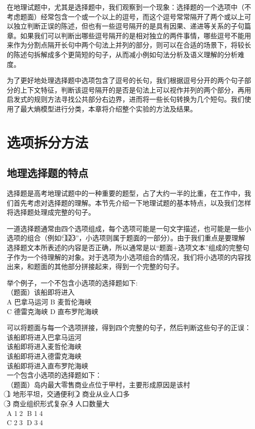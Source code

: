 \documentclass[master, winfont]{njuthesis}
\begin{document}
在地理试题中，尤其是选择题中，我们观察到一个现象：选择题的一个选项中（不考虑题面）经常包含一个或一个以上的逗号，而这个逗号常常隔开了两个或以上可以独立判断正误的陈述，但也有一些逗号隔开的是具有因果、递进等关系的子句篇章。如果我们可以判断出哪些逗号隔开的是相对独立的两件事情，哪些逗号不能用来作为分割点隔开长句中两个句法上并列的部分，则可以在合适的场景下，将较长的陈述句拆解成多个更简短的句子，从而减小例如句法分析及语义理解的分析难度。

为了更好地处理选择题中选项包含了逗号的长句，我们根据逗号分开的两个句子部分的上下文特征，判断该逗号隔开的是否是句法上可以视作并列的两个部分，再用启发式的规则方法寻找公共部分右边界，进而将一些长句转换为几个短句。我们使用了最大熵模型进行分类，本章将介绍整个实验的方法及结果。

\section{选项拆分方法}
\label{section:split_method}
\subsection{地理选择题的特点}
选择题是高考地理试题中的一种重要的题型，占了大约一半的比重，在工作中，我们首先考虑对选择题的理解。本节先介绍一下地理试题的基本特点，以及我们怎样将选择题处理成完整的句子。

一道选择题通常由四个选项组成，每个选项可能是一句文字描述，也可能是一些小选项的组合（例如“\textcircled{1}\textcircled{2}\textcircled{3}”，小选项则属于题面的一部分）。由于我们重点是要理解选择题文本所表述的内容是否正确，所以通常是以“题面+选项文本”组成的完整句子作为一个待理解的对象。对于选项为小选项组合的情况，我们将小选项的内容找出来，和题面的其他部分拼接起来，得到一个完整的句子。

举个例子，一个不包含小选项的选择题如下:\\
（题面）该船即将进入\\
A 巴拿马运河   B 麦哲伦海峡\\
C 德雷克海峡   D 直布罗陀海峡

可以将题面与每一个选项拼接，得到四个完整的句子，然后判断这些句子的正误：\\
该船即将进入巴拿马运河\\
该船即将进入麦哲伦海峡\\
该船即将进入德雷克海峡\\
该船即将进入直布罗陀海峡\\

一个包含小选项的选择题如下：\\
（题面）岛内最大零售商业点位于甲村，主要形成原因是该村 \\
\textcircled{1} 地形平坦，交通便利   \textcircled{2} 商业从业人口多\\
\textcircled{3} 商业组织形式复杂     \textcircled{4} 人口数量大  \\
A \textcircled{1}\textcircled{2}  B \textcircled{1}\textcircled{4}\\
C \textcircled{2}\textcircled{3}  D \textcircled{3}\textcircled{4}\\
\end{document}
